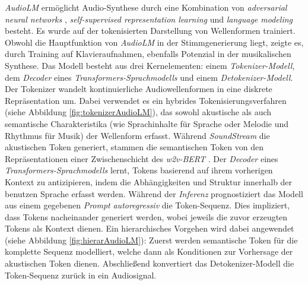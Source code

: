 \documentclass[
  a4paper,  %
  twoside,  %
  bibliography=totoc,
  headsepline,
  cleardoublepage=empty,
  parskip=half,
  draft=false
]{scrbook}
\begin{document}
\emph{AudioLM} \cite{borsos_audiolm_2022} ermöglicht Audio-Synthese durch eine Kombination von \emph{adversarial neural networks} \cite{goodfellow_generative_2014}, \emph{self-supervised representation learning} \cite{chung_w2v-bert_2021} und \emph{language modeling} \cite{roberts_scaling_2022} besteht. Es wurde auf der tokenisierten Darstellung von Wellenformen trainiert. Obwohl die Hauptfunktion von \emph{AudioLM} in der Stimmgenerierung liegt, zeigte es, durch Training auf Klavieraufnahmen, ebenfalls Potenzial in der musikalischen Synthese.  Das Modell besteht aus drei Kernelementen: einem \emph{Tokenizer-Modell}, dem \emph{Decoder} eines \emph{Transformers-Sprachmodells} \cite{vaswani_attention_2017} und einem \emph{Detokenizer-Modell}. Der Tokenizer wandelt kontinuierliche Audiowellenformen in eine diskrete Repräsentation um. Dabei verwendet es ein hybrides Tokenisierungsverfahren (siehe Abbildung \ref{fig:tokenizerAudioLM}), das sowohl akustische als auch semantische Charakteristika (wie Sprachinhalte für Sprache oder Melodie und Rhythmus für Musik) der Wellenform erfasst. Während \emph{SoundStream} \cite{zeghidour_soundstream_2021} die akustischen Token generiert, stammen die semantischen Token von den Repräsentationen einer Zwischenschicht des \emph{w2v-BERT} \cite{chung_w2v-bert_2021}. Der \emph{Decoder} eines \emph{Transformers-Sprachmodells} \cite{vaswani_attention_2017} lernt, Tokens basierend auf ihrem vorherigen Kontext zu antizipieren, indem die Abhängigkeiten und Struktur innerhalb der benutzen Sprache erfasst werden. Während der \emph{Inferenz} prognostiziert das Modell aus einem gegebenen \emph{Prompt} \emph{autoregressiv} die Token-Sequenz. Dies impliziert, dass Tokens nacheinander generiert werden, wobei jeweils die zuvor erzeugten Tokens als Kontext dienen. Ein hierarchisches Vorgehen wird dabei angewendet (siehe Abbildung \ref{fig:hierarAudioLM}): Zuerst werden semantische Token für die komplette Sequenz modelliert, welche dann als Konditionen zur Vorhersage der akustischen Token dienen. Abschließend konvertiert das Detokenizer-Modell die Token-Sequenz zurück in ein Audiosignal. \cite{borsos_audiolm_2022}
\end{document}
